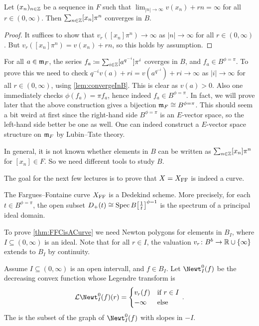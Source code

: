 \documentclass[a4paper, 10pt, oneside, DIV=9, chapterprefix=true, numbers=enddot,bibliography=totoc]{scrbook}
\begin{document}
\begin{lem}\label{lem:convergeInB}
	Let $(x_n)_{n\in\mathbb{Z}}$ be a sequence in $F$ such that $\lim_{|n|\to\infty}v(x_n)+rn=\infty$ for all $r\in(0,\infty)$. Then $\sum_{n\in\mathbb{Z}}[x_n]\pi^n$ converges in $B$.
\end{lem}
\begin{proof}
	It suffices to show that $v_r([x_n]\pi^n)\to\infty$ as $|n|\to\infty$ for all $r\in(0,\infty)$. But $v_r([x_n]\pi^n)=v(x_n)+rn$, so this holds by assumption.
\end{proof}
\begin{rem}\label{lem:convergenceInB}
	\begin{numerate}
		\item For all $a\in \mathfrak{m}_F$, the series $f_a\coloneqq \sum_{i\in\mathbb{Z}}[a^{q^{-i}}]\pi^i$ coverges in $B$, and $f_a\in B^{\phi=\pi}$. To prove this we need to check $q^{-i}v(a)+ri=v(a^{q^{-i}})+ri\to \infty$ as $|i|\to\infty$ for all $r\in(0,\infty)$, using \cref{lem:convergeInB}. This is clear as $v(a)>0$. Also one immediately checks $\phi(f_a)=\pi f_a$, hence indeed $f_a\in B^{\phi=\pi}$. In fact, we will prove later that the above construction gives a bijection $\mm_F\cong B^{\phi=\pi}$. This should seem a bit weird at first since the right-hand side $B^{\phi=\pi}$ is an $E$-vector space, so the left-hand side better be one as well. One can indeed construct a $E$-vector space structure on $\mathfrak{m}_F$ by Lubin--Tate theory.
		\item In general, it is not known whether elements in $B$ can be written as $\sum_{n\in\mathbb{Z}}[x_n]\pi^n$ for $[x_n]\in F$. So we need different tools to study $B$.
	\end{numerate}
\end{rem}
The goal for the next few lectures is to prove that $X=X_{\mathrm{FF}}$ is indeed a curve.
\begin{thm}\label{thm:FFCisACurve}
	The Fargues--Fontaine curve $X_{\mathrm{FF}}$ is a Dedekind scheme. More precisely, for each $t\in B^{\phi=\pi}$, the open subset $D_+(t)\cong \Spec B\big[\frac 1t\big]^{\phi=1}$ is the spectrum of a principal ideal domain.
\end{thm}
To prove \cref{thm:FFCisACurve} we need Newton polygons for elements in $B_I$, where $I\subseteq (0,\infty)$ is an ideal. Note that for all $r\in I$, the valuation $v_r\colon B^b\morphism \IR\cup\{\infty\}$ extends to $B_I$ by continuity.
\begin{defi}\label{def:NewtOpen}
	Assume $I\subseteq (0,\infty)$ is an open intervall, and $f\in B_I$. Let $\Newt_I^0(f)$ be the decreasing convex function whose Legendre transform is
	\begin{equation*}
		\Ll\Newt_I^0(f)(r)=\begin{cases}
		v_r(f) & \text{if }r\in I\\
		-\infty & \text{else}
		\end{cases}\,.
	\end{equation*}
	The  is the subset of the graph of $\Newt_I^0(f)$ with slopes in $-I$.
\end{defi}
\end{document}
